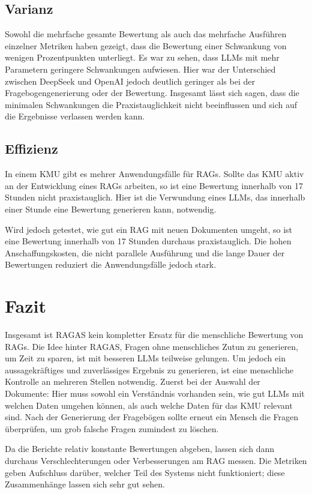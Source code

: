 \subsection{Varianz}

Sowohl die mehrfache gesamte Bewertung als auch das mehrfache Ausführen einzelner Metriken haben gezeigt, dass die Bewertung einer Schwankung von wenigen Prozentpunkten unterliegt.
Es war zu sehen, dass LLMs mit mehr Parametern geringere Schwankungen aufwiesen.
Hier war der Unterschied zwischen DeepSeek und OpenAI jedoch deutlich geringer als bei der Fragebogengenerierung oder der Bewertung.
Insgesamt lässt sich sagen, dass die minimalen Schwankungen die Praxistauglichkeit nicht beeinflussen und sich auf die Ergebnisse verlassen werden kann.

\subsection{Effizienz}
In einem KMU gibt es mehrer Anwendungsfälle für RAGs.
Sollte das KMU aktiv an der Entwicklung eines RAGs arbeiten, so ist eine Bewertung innerhalb von 17 Stunden nicht praxistauglich.
Hier ist die Verwundung eines LLMs, das innerhalb einer Stunde eine Bewertung generieren kann, notwendig.

Wird jedoch getestet, wie gut ein RAG mit neuen Dokumenten umgeht, so ist eine Bewertung innerhalb von 17 Stunden durchaus praxistauglich.
Die hohen Anschaffungskosten, die nicht parallele Ausführung und die lange Dauer der Bewertungen reduziert die Anwendungsfälle jedoch stark.


\section{Fazit}
Insgesamt ist RAGAS kein kompletter Ersatz für die menschliche Bewertung von RAGs. Die Idee hinter RAGAS, Fragen ohne menschliches Zutun zu generieren, um Zeit zu sparen, ist mit besseren LLMs teilweise gelungen.
Um jedoch ein aussagekräftiges und zuverlässiges Ergebnis zu generieren, ist eine menschliche Kontrolle an mehreren Stellen notwendig.
Zuerst bei der Auswahl der Dokumente: Hier muss sowohl ein Verständnis vorhanden sein, wie gut LLMs mit welchen Daten umgehen können, als auch welche Daten für das KMU relevant sind.
Nach der Generierung der Fragebögen sollte erneut ein Mensch die Fragen überprüfen, um grob falsche Fragen zumindest zu löschen.

Da die Berichte relativ konstante Bewertungen abgeben, lassen sich dann durchaus Verschlechterungen oder Verbesserungen am RAG messen.
Die Metriken geben Aufschluss darüber, welcher Teil des Systems nicht funktioniert; diese Zusammenhänge lassen sich sehr gut sehen.

